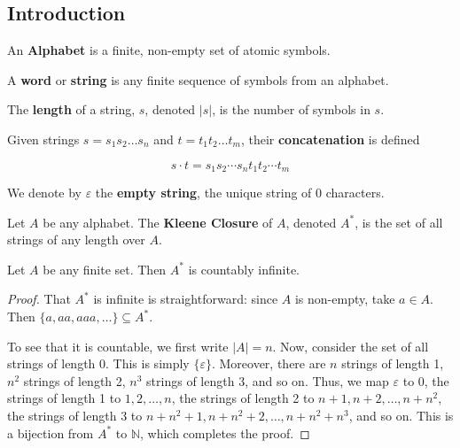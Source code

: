 \subsection{Introduction}\label{subsec:introduction}
\begin{definition}
 An \textbf{Alphabet} is a finite, non-empty set of atomic symbols.
\end{definition}

\begin{definition}
 A \textbf{word} or \textbf{string} is any finite sequence of symbols from an alphabet. 
\end{definition}

\begin{definition}
 The \textbf{length} of a string, \(s\), denoted \(|s|\), is the number of symbols in \(s\). 
\end{definition}

\begin{definition}
 Given strings \(s=s_1s_2\hdots s_n\) and \(t=t_1t_2\hdots t_m\), their \textbf{concatenation} is defined 
 
 \[s\cdot t=s_1s_2\cdots s_nt_1t_2\cdots t_m\]
\end{definition}

We denote by \(\varepsilon\) the \textbf{empty string}, the unique string of 0 characters. 

\begin{definition}
 Let \(A\) be any alphabet. The \textbf{Kleene Closure} of \(A\), denoted \(A^*\), is the set of all strings of any length over \(A\).  
\end{definition}

\begin{theorem}
 Let \(A\) be any finite set. Then \(A^*\) is countably infinite. 
\end{theorem}

\begin{proof}
 That \(A^*\) is infinite is straightforward: since \(A\) is non-empty, take \(a\in A\). Then \(\{a, aa, aaa, \hdots\}\subseteq A^*\).
 
 To see that it is countable, we first write \(|A|=n\). Now, consider the set of all strings of length 0. This is simply \(\{\varepsilon\}\). Moreover, there are \(n\) strings of length 1, \(n^2\) strings of length 2, \(n^3\) strings of length 3, and so on. Thus, we map \(\varepsilon\) to 0, the strings of length 1 to \(1, 2, \hdots, n\), the strings of length 2 to \(n+1, n+2, \hdots, n+n^2\), the strings of length 3 to \(n+n^2+1, n+n^2+2,\hdots, n+n^2+n^3\), and so on. This is a bijection from \(A^*\) to \(\mathbb{N}\), which completes the proof.
\end{proof}

